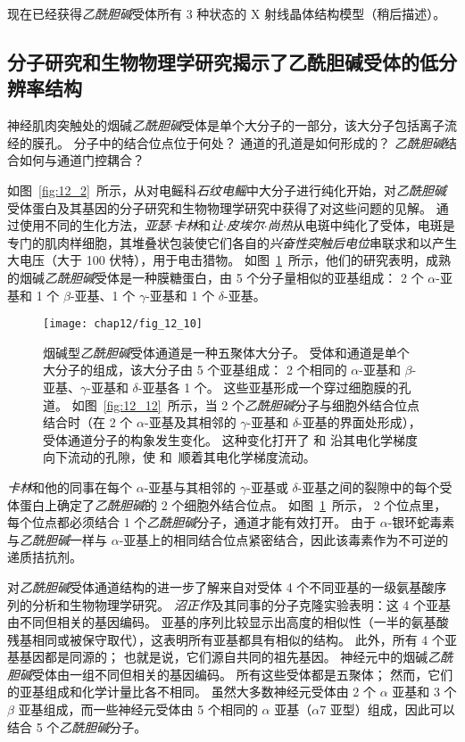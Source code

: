 现在已经获得\textit{乙酰胆碱}受体所有 3 种状态的 X 射线晶体结构模型（稍后描述）。



\subsection{分子研究和生物物理学研究揭示了乙酰胆碱受体的低分辨率结构}

神经肌肉突触处的烟碱\textit{乙酰胆碱}受体是单个大分子的一部分，该大分子包括离子流经的膜孔。
分子中的结合位点位于何处？ 通道的孔道是如何形成的？
\textit{乙酰胆碱}结合如何与通道门控耦合？


如图~\ref{fig:12_2}~所示，从对电鳐科\textit{石纹电鳐}中大分子进行纯化开始，对\textit{乙酰胆碱}受体蛋白及其基因的分子研究和生物物理学研究中获得了对这些问题的见解。
通过使用不同的生化方法，\textit{亚瑟$\cdot$卡林}和\textit{让$\cdot$皮埃尔$\cdot$尚热}从电斑中纯化了受体，电斑是专门的肌肉样细胞，其堆叠状包装使它们各自的\textit{兴奋性突触后电位}串联求和以产生大电压（大于 100 伏特），用于电击猎物。
如图~\ref{fig:12_10}~所示，他们的研究表明，成熟的烟碱\textit{乙酰胆碱}受体是一种膜糖蛋白，由 5 个分子量相似的亚基组成：
2 个 $\alpha$-亚基和 1 个 $\beta$-亚基、1 个 $\gamma$-亚基和 1 个 $\delta$-亚基。


\begin{figure}[htbp]
	\centering
	\texttt{[image: chap12/fig\_12\_10]}
	\caption{烟碱型\textit{乙酰胆碱}受体通道是一种五聚体大分子。
		受体和通道是单个大分子的组成，该大分子由 5 个亚基组成：
		2 个相同的 $\alpha$-亚基和 $\beta$-亚基、$\gamma$-亚基和 $\delta$-亚基各 1 个。
		这些亚基形成一个穿过细胞膜的孔道。
		如图~\ref{fig:12_12}~所示，当 2 个\textit{乙酰胆碱}分子与细胞外结合位点结合时（在 2 个 $\alpha$-亚基及其相邻的 $\gamma$-亚基和 $\delta$-亚基的界面处形成），受体通道分子的构象发生变化。
		这种变化打开了  和  沿其电化学梯度向下流动的孔隙，使  和~顺着其电化学梯度流动。}
	\label{fig:12_10}
\end{figure}


\textit{卡林}和他的同事在每个 $\alpha$-亚基与其相邻的 $\gamma$-亚基或 $\delta$-亚基之间的裂隙中的每个受体蛋白上确定了\textit{乙酰胆碱}的 2 个细胞外结合位点。
如图~\ref{fig:12_10}~所示， 2 个位点里，每个位点都必须结合 1 个\textit{乙酰胆碱}分子，通道才能有效打开。
由于 $\alpha$-银环蛇毒素与\textit{乙酰胆碱}一样与 $\alpha$-亚基上的相同结合位点紧密结合，因此该毒素作为不可逆的递质拮抗剂。


对\textit{乙酰胆碱}受体通道结构的进一步了解来自对受体 4 个不同亚基的一级氨基酸序列的分析和生物物理学研究。
\textit{沼正作}及其同事的分子克隆实验表明：这 4 个亚基由不同但相关的基因编码。
亚基的序列比较显示出高度的相似性（一半的氨基酸残基相同或被保守取代），这表明所有亚基都具有相似的结构。 
此外，所有 4 个亚基基因都是同源的；
也就是说，它们源自共同的祖先基因。
神经元中的烟碱\textit{乙酰胆碱}受体由一组不同但相关的基因编码。
所有这些受体都是五聚体；
然而，它们的亚基组成和化学计量比各不相同。
虽然大多数神经元受体由 2 个 $\alpha$ 亚基和 3 个 $\beta$ 亚基组成，而一些神经元受体由 5 个相同的 $\alpha$ 亚基（$\alpha$7 亚型）组成，因此可以结合 5 个\textit{乙酰胆碱}分子。


